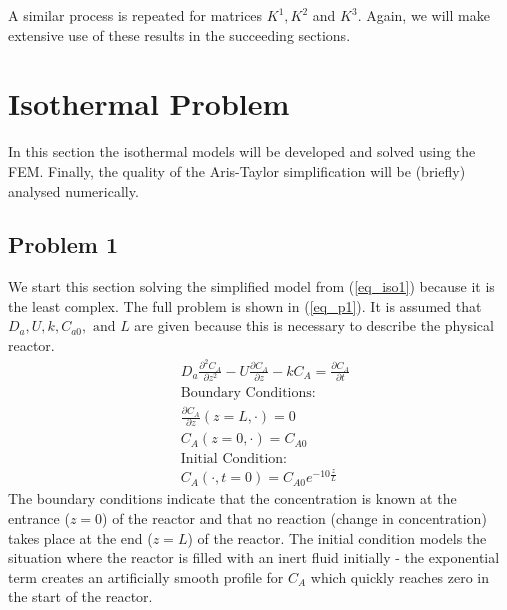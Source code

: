 \documentclass[11pt,fleqn]{article}
\theoremstyle{defstyle}
\begin{document}
A similar process is repeated for matrices $K^1, K^2$ and $K^3$. Again, we will make extensive use of these results in the succeeding sections.

\section{Isothermal Problem}
In this section the isothermal models will be developed and solved using the FEM. Finally, the quality of the Aris-Taylor simplification will be (briefly) analysed numerically.  
\subsection{Problem 1}
\label{section_isop1}
We start this section solving the simplified model from (\ref{eq_iso1}) because it is the least complex. The full problem is shown in (\ref{eq_p1}). It is assumed that $D_a, U, k, C_{a0},\text{ and } L$ are given because this is necessary to describe the physical reactor.  
\begin{equation}
\begin{aligned}
&D_a \frac{\partial^2 C_A}{\partial z^2} - U \frac{\partial C_A}{\partial z} - kC_A = 
\frac{\partial C_A}{\partial t} \\
&\text{Boundary Conditions:} \\
&\frac{\partial C_A}{\partial z}(z=L, \cdot) = 0\\
&C_A(z=0, \cdot) = C_{A0} \\
&\text{Initial Condition:} \\
& C_A(\cdot, t= 0) = C_{A0}e^{-10\frac{z}{L}}
\end{aligned}
\label{eq_p1}
\end{equation}
The boundary conditions indicate that the concentration is known at the entrance ($z=0$) of the reactor and that no reaction (change in concentration) takes place at the end ($z=L$) of the reactor. The initial condition models the situation where the reactor is filled with an inert fluid initially - the exponential term creates an artificially smooth profile for $C_{A}$ which quickly reaches zero in the start of the reactor. 
\end{document}

